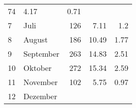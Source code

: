 \begin{longtable}{lXrrr}
       \num{74} &
       \num[round-mode=places,round-precision=2]{4,17} &
         \num[round-mode=places,round-precision=2]{0,71} \\

     7 &
     \multicolumn{1}{X}{ Juli   } &


       \num{126} &
       \num[round-mode=places,round-precision=2]{7,11} &
         \num[round-mode=places,round-precision=2]{1,2} \\

     8 &
     \multicolumn{1}{X}{ August   } &


       \num{186} &
       \num[round-mode=places,round-precision=2]{10,49} &
         \num[round-mode=places,round-precision=2]{1,77} \\

     9 &
     \multicolumn{1}{X}{ September   } &


       \num{263} &
       \num[round-mode=places,round-precision=2]{14,83} &
         \num[round-mode=places,round-precision=2]{2,51} \\

     10 &
     \multicolumn{1}{X}{ Oktober   } &


       \num{272} &
       \num[round-mode=places,round-precision=2]{15,34} &
         \num[round-mode=places,round-precision=2]{2,59} \\

     11 &
     \multicolumn{1}{X}{ November   } &


       \num{102} &
       \num[round-mode=places,round-precision=2]{5,75} &
         \num[round-mode=places,round-precision=2]{0,97} \\

     12 &
     \multicolumn{1}{X}{ Dezember   } &



\end{longtable}
